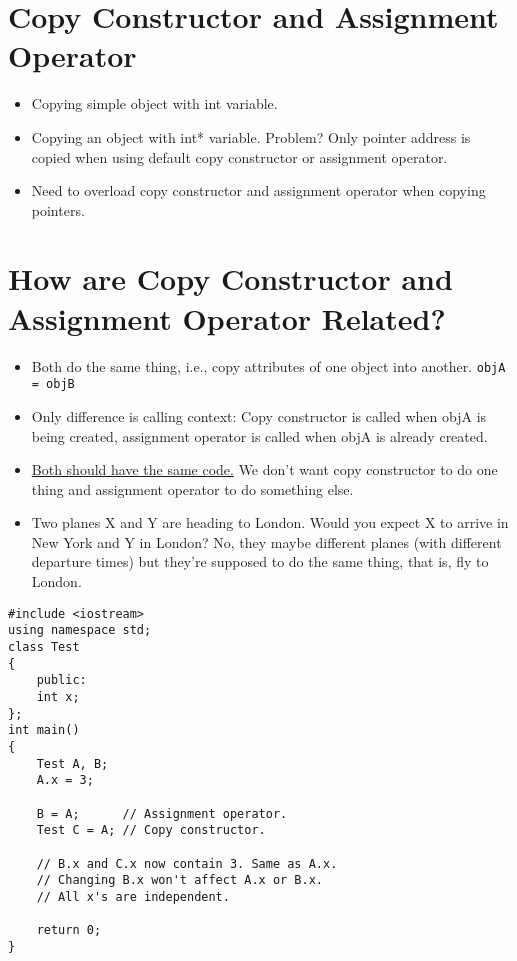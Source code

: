 \documentclass[12pt,a4paper]{article}
\begin{document}
\section{Copy Constructor and Assignment Operator}
\begin{itemize}
\item Copying simple object with int variable.
\item Copying an object with int* variable. Problem? Only pointer address is copied when using default copy constructor or assignment operator.
\item Need to overload copy constructor and assignment operator when copying pointers.
\end{itemize}
\section{How are Copy Constructor and Assignment Operator Related?}
\begin{itemize}
\item Both do the same thing, i.e., copy attributes of one object into another. \verb|objA = objB|
\item Only difference is calling context: Copy constructor is called when objA is being created, assignment operator is called when objA is already created.
\item \underline{Both should have the same code.} We don't want copy constructor to do one thing and assignment operator to do something else.
\item Two planes X and Y are heading to London. Would you expect X to arrive in New York and Y in London? No, they maybe different planes (with different departure times) but they're supposed to do the same thing, that is, fly to London.
\end{itemize}
\begin{minipage}{7.5cm}
\begin{lstlisting}[caption={Default object copy}]
#include <iostream>
using namespace std;
class Test
{
	public:
	int x;
};
int main()
{
	Test A, B;
	A.x = 3;
	
	B = A;		// Assignment operator.
	Test C = A; // Copy constructor.
	
	// B.x and C.x now contain 3. Same as A.x.
	// Changing B.x won't affect A.x or B.x.
	// All x's are independent.
	
	return 0;
}
\end{lstlisting}
\end{minipage}
\hspace*{1cm}
\end{document}
